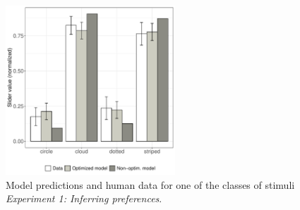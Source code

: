 \documentclass[10pt,a4paper]{article}
\begin{document}
\begin{figure}[ht!]
	\centering
	\includegraphics[width=2.5in]{images/barplot_x4.pdf}
	\caption{Model predictions and human data for one of the classes of stimuli \emph{Experiment 1: Inferring preferences}.}\label{barplot_x4}
\end{figure}

\end{document}
